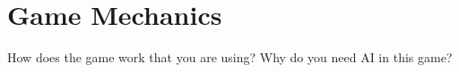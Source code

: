 \section{Game Mechanics}
\label{03}

How does the game work that you are using? Why do you need AI in this game?